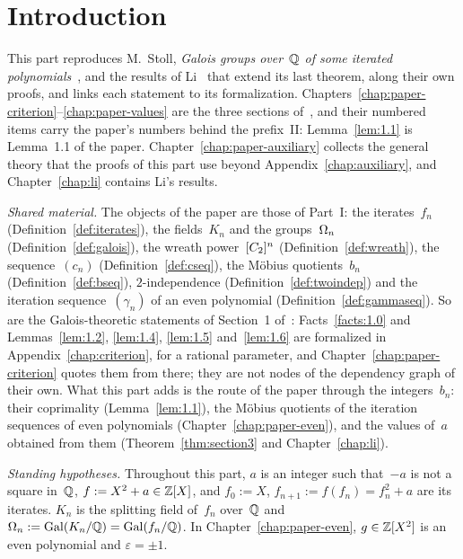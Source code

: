 \chapter*{Introduction}

This part reproduces M.~Stoll, \emph{Galois groups over~$\mathbb{Q}$ of some iterated
polynomials}~\cite{paper}, and the results of Li~\cite{li2020, li2021} that extend its last
theorem, along their own proofs, and links each statement to its formalization.
Chapters~\ref{chap:paper-criterion}--\ref{chap:paper-values} are the three sections
of~\cite{paper}, and their numbered items carry the paper's numbers behind the prefix~II:
Lemma~\ref{lem:1.1} is Lemma~1.1 of the paper. Chapter~\ref{chap:paper-auxiliary} collects the general
theory that the proofs of this part use beyond Appendix~\ref{chap:auxiliary}, and
Chapter~\ref{chap:li} contains Li's results.

\emph{Shared material.} The objects of the paper are those of Part~I: the iterates~$f_n$
(Definition~\ref{def:iterates}), the fields~$K_n$ and the groups~$\Omega_n$
(Definition~\ref{def:galois}), the wreath power~$[C_2]^{n}$ (Definition~\ref{def:wreath}), the
sequence~$(c_n)$ (Definition~\ref{def:cseq}), the Möbius quotients~$b_n$
(Definition~\ref{def:bseq}), $2$-independence (Definition~\ref{def:twoindep}) and the iteration
sequence~$(\gamma_n)$ of an even polynomial (Definition~\ref{def:gammaseq}). So are the
Galois-theoretic statements of Section~1 of~\cite{paper}: Facts~\ref{facts:1.0} and
Lemmas~\ref{lem:1.2}, \ref{lem:1.4}, \ref{lem:1.5} and~\ref{lem:1.6} are formalized in
Appendix~\ref{chap:criterion}, for a rational parameter, and
Chapter~\ref{chap:paper-criterion} quotes them from there; they are not nodes of the dependency
graph of their own. What this part adds is the route of the paper through the integers~$b_n$:
their coprimality (Lemma~\ref{lem:1.1}), the Möbius quotients of the iteration sequences of even
polynomials (Chapter~\ref{chap:paper-even}), and the values of~$a$ obtained from them
(Theorem~\ref{thm:section3} and Chapter~\ref{chap:li}).

\emph{Standing hypotheses.} Throughout this part, $a$ is an integer such that~$-a$ is not a
square in~$\mathbb{Q}$, $f := X^2 + a \in \mathbb{Z}[X]$, and $f_0 := X$, $f_{n+1} := f(f_n) = f_n^2 + a$ are
its iterates. $K_n$ is the splitting field of~$f_n$ over~$\mathbb{Q}$ and $\Omega_n := \operatorname{Gal}(K_n/\mathbb{Q}) =
\operatorname{Gal}(f_n/\mathbb{Q})$. In Chapter~\ref{chap:paper-even}, $g \in \mathbb{Z}[X^2]$ is an even polynomial and
$\varepsilon = \pm 1$.

